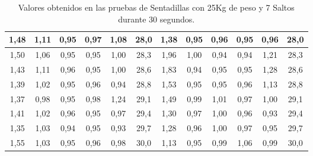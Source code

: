 \begin{table}[H]
\begin{center}
{\begin{tabular}{| c | c | c | c | c | c | c | c | c | c | c | c |}
\hline
1,48 &	1,11 &	0,95 &	0,97 &	1,08 &	28,0 & 1,38 & 0,95 & 0,96 & 0,95 & 0,96 & 28,0\\
\hline
1,50 &	1,06 &	0,95 &	0,95 &	1,00 &	28,3 & 1,96 & 1,00 & 0,94 & 0,94 & 1,21 & 28,3\\
\hline
1,43 &	1,11 &	0,96 &	0,95 &	1,00 &	28,6 & 1,83 & 0,94 & 0,95 & 0,95 & 1,28 & 28,6\\
\hline
1,39 &	1,02 &	0,95 &	0,96 &	0,94 &	28,8 & 1,53 & 0,95 & 0,95 & 0,96 & 1,13 & 28,8\\
\hline
1,37 &	0,98 &	0,95 &	0,98 &	1,24 &	29,1 & 1,49 & 0,99 & 1,01 & 0,97 & 1,00 & 29,1\\
\hline
1,41 &	1,02 &	0,96 &	0,95 &	0,97 &	29,4 & 1,30 & 0,97 & 1,00 & 0,96 & 0,93 & 29,4\\
\hline
1,35 &	1,03 &	0,94 &	0,95 &	0,93 &	29,7 & 1,28 & 0,96 & 1,00 & 0,97 & 0,95 & 29,7\\
\hline
1,55 &	1,03 &	0,95 &	0,96 &	0,98 &	30,0 & 1,13 & 0,95 & 0,99 & 1,06 & 0,99 & 30,0\\
 \hline
\end{tabular}
}
\caption{Valores obtenidos en las pruebas de Sentadillas con 25Kg de peso y 7 Saltos durante 30 segundos.}
\label{Table:Sentadillas_y_Saltos}
\end{center}
\end{table}

